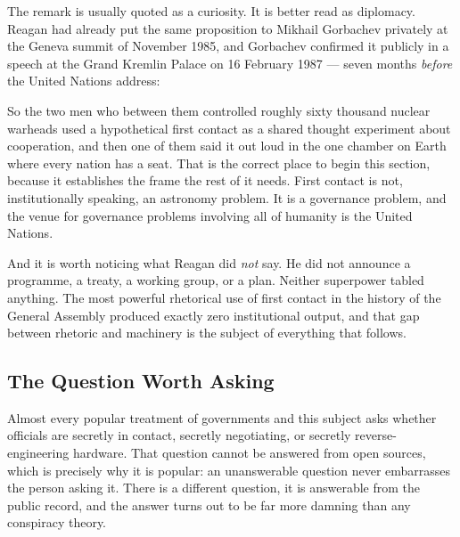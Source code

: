 The remark is usually quoted as a curiosity. It is better read as diplomacy. Reagan had already
put the same proposition to Mikhail Gorbachev privately at the Geneva summit of November 1985, and
Gorbachev confirmed it publicly in a speech at the Grand Kremlin Palace on 16 February 1987 ---
seven months \emph{before} the United Nations address:


So the two men who between them controlled roughly sixty thousand nuclear warheads used a
hypothetical first contact as a shared thought experiment about cooperation, and then one of them
said it out loud in the one chamber on Earth where every nation has a seat. That is the correct
place to begin this section, because it establishes the frame the rest of it needs. First contact
is not, institutionally speaking, an astronomy problem. It is a governance problem, and the venue
for governance problems involving all of humanity is the United Nations.

And it is worth noticing what Reagan did \emph{not} say. He did not announce a programme, a
treaty, a working group, or a plan. Neither superpower tabled anything. The most powerful
rhetorical use of first contact in the history of the General Assembly produced exactly zero
institutional output, and that gap between rhetoric and machinery is the subject of everything
that follows.

\subsection{The Question Worth Asking}

Almost every popular treatment of governments and this subject asks whether officials are secretly
in contact, secretly negotiating, or secretly reverse-engineering hardware. That question cannot be
answered from open sources, which is precisely why it is popular: an unanswerable question never
embarrasses the person asking it. There is a different question, it is answerable from the public
record, and the answer turns out to be far more damning than any conspiracy theory.


